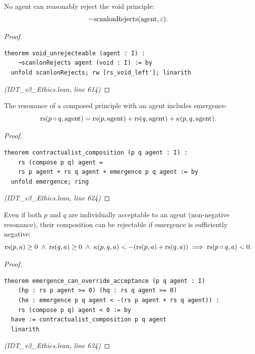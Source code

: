 \begin{theorem}
\label{thm:void-unrejectable}
No agent can reasonably reject the void principle:
\[
  \neg\, \mathrm{scanlonRejects}(\mathrm{agent}, \varepsilon).
\]
\end{theorem}

\begin{proof}
\begin{lstlisting}
theorem void_unrejecteable (agent : I) :
    ¬scanlonRejects agent (void : I) := by
  unfold scanlonRejects; rw [rs_void_left']; linarith
\end{lstlisting}
\textit{(IDT\_v3\_Ethics.lean, line 614)}
\end{proof}

\begin{theorem}
\label{thm:contractualist-composition}
The resonance of a composed principle with an agent includes emergence:
\[
  \mathrm{rs}(p \circ q, \mathrm{agent}) = \mathrm{rs}(p, \mathrm{agent})
  + \mathrm{rs}(q, \mathrm{agent}) + \kappa(p, q, \mathrm{agent}).
\]
\end{theorem}

\begin{proof}
\begin{lstlisting}
theorem contractualist_composition (p q agent : I) :
    rs (compose p q) agent =
    rs p agent + rs q agent + emergence p q agent := by
  unfold emergence; ring
\end{lstlisting}
\textit{(IDT\_v3\_Ethics.lean, line 624)}
\end{proof}

\begin{theorem}
\label{thm:emergence-override}
Even if both $p$ and $q$ are individually acceptable to an agent (non-negative
resonance), their composition can be rejectable if emergence is sufficiently
negative:
\[
  \mathrm{rs}(p, a) \geq 0 \;\wedge\; \mathrm{rs}(q, a) \geq 0 \;\wedge\;
  \kappa(p, q, a) < -(\mathrm{rs}(p, a) + \mathrm{rs}(q, a))
  \implies \mathrm{rs}(p \circ q, a) < 0.
\]
\end{theorem}

\begin{proof}
\begin{lstlisting}
theorem emergence_can_override_acceptance (p q agent : I)
    (hp : rs p agent >= 0) (hq : rs q agent >= 0)
    (he : emergence p q agent < -(rs p agent + rs q agent)) :
    rs (compose p q) agent < 0 := by
  have := contractualist_composition p q agent
  linarith
\end{lstlisting}
\textit{(IDT\_v3\_Ethics.lean, line 634)}
\end{proof}

